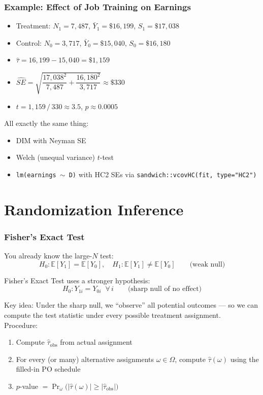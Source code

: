 \documentclass[xcolor=dvipsnames]{beamer}
\newcommand\E{\mathbb{E}}
\begin{document}
\begin{frame}
  \frametitle{Example: Effect of Job Training on Earnings}
\small
\begin{itemize}
  \item Treatment: $N_1=7{,}487$, \quad $\bar{Y}_1 = \$16{,}199$, \quad $S_1 = \$17{,}038$
  \item Control: $N_0=3{,}717$, \quad $\bar{Y}_0 = \$15{,}040$, \quad $S_0 = \$16{,}180$
  \medskip
  \item<2-> $\hat\tau = 16{,}199 - 15{,}040 = \$1{,}159$ \medskip
  \item<3-> $\widehat{SE} = \sqrt{\dfrac{17{,}038^2}{7{,}487}+ \dfrac{16{,}180^2}{3{,}717}} \approx \$330$
  \medskip
  \item<4-> $t = 1{,}159\,/\,330 \approx 3.5$, \quad $p \approx 0.0005$
\end{itemize}
\bigskip
{} \footnotesize All exactly the same thing:
\begin{itemize}
 \item DIM with Neyman SE
 \item Welch (unequal variance) $t$-test
 \item  \texttt{lm(earnings $\sim$ D)} with HC2 SEs via \texttt{sandwich::vcovHC(fit, type="HC2")}
 \end{itemize}
\end{frame}


\section{Randomization Inference}

\begin{frame}\frametitle{Fisher's Exact Test}
\small
{} You already know the large-$N$ test:
\[
H_0:\E[Y_1] =\E[Y_0],\quad H_1:\E[Y_1] \neq\E[Y_0]  \qquad \text{(weak null)}
\]
\pause

Fisher's Exact Test uses a stronger hypothesis:
\[
H_0: Y_{1i} = Y_{0i} \;\; \forall\, i  \qquad \text{(sharp null of no effect)}
\]

\pause
\medskip
\alert{Key idea}: Under the sharp null, we ``observe'' all potential outcomes --- so we can compute the test statistic under every possible treatment assignment.\\

\pause
\medskip
Procedure:
\footnotesize
\begin{enumerate}
\item Compute $\hat\tau_{\text{obs}}$ from actual assignment
\item For every (or many) alternative assignments $\omega \in \Omega$, compute $\hat\tau(\omega)$ using the filled-in PO schedule
\item $p$-value $= \Pr_\omega\!\bigl(|\hat\tau(\omega)| \geq |\hat\tau_{\text{obs}}|\bigr)$
\end{enumerate}
\end{frame}
\end{document}
